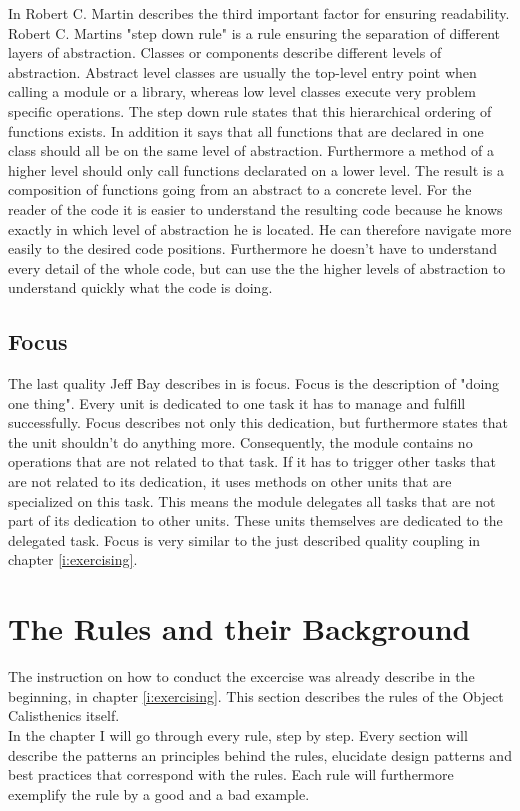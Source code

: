 In \cite{cc} Robert C. Martin describes the third important factor for ensuring readability. Robert C. Martins "step down rule" is a rule ensuring the separation of different layers of abstraction. Classes or components describe different levels of abstraction. Abstract level classes are usually the top-level entry point when calling a module or a library, whereas low level classes execute very problem specific operations. The step down rule states that this hierarchical ordering of functions exists. In addition it says that all functions that are declared in one class should all be on the same level of abstraction. Furthermore a method of a higher level should only call functions declarated on a lower level. The result is a composition of functions going from an abstract to a concrete level. For the reader of the code it is easier to understand the resulting code because he knows exactly in which level of abstraction he is located. He can therefore navigate more easily to the desired code positions. Furthermore he doesn't have to understand every detail of the whole code, but can use the the higher levels of abstraction to understand quickly what the code is doing. 

\subsection*{Focus}
\label{focus}
The last quality Jeff Bay describes in \cite{oc2008} is focus. Focus is the description of "doing one thing". Every unit is dedicated to one task it has to manage and fulfill successfully. Focus describes not only this dedication, but furthermore states that the unit shouldn't do anything more. Consequently, the module contains no operations that are not related to that task. If it has to trigger other tasks that are not related to its dedication, it uses methods on other units that are specialized on this task. This means the module delegates all tasks that are not part of its dedication to other units. These units themselves are dedicated to the delegated task. Focus is very similar to the just described quality coupling in chapter \ref{i:exercising}.

\section{The Rules and their Background}
\label{d:background}
 The instruction on how to conduct the excercise was already describe in the beginning, in chapter \ref{i:exercising}. This section describes the rules of the Object Calisthenics itself. \\
 In the chapter I will go through every rule, step by step. Every section will describe the patterns an principles behind the rules, elucidate design patterns and best practices that correspond with the rules. Each rule will furthermore exemplify the rule by a good and a bad example. 

